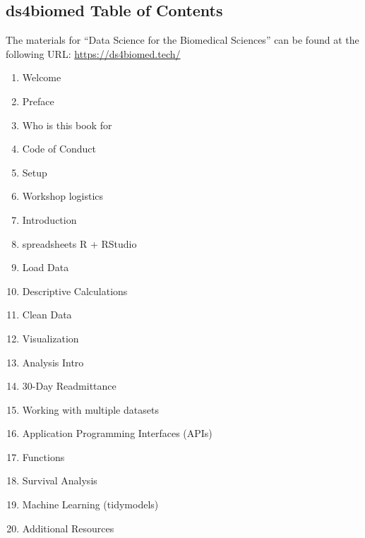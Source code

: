 \documentclass[030-workshop.tex]{subfiles}
\begin{document}
\subsection{ds4biomed Table of Contents}
\label{sse:ds4biomed-toc}

The materials for ``Data Science for the Biomedical Sciences'' can be found at the following URL:
\url{https://ds4biomed.tech/}

\begin{enumerate}
    \item Welcome
    \item Preface
    \item Who is this book for
    \item Code of Conduct
    \item Setup
    \item Workshop logistics
    \item Introduction
    \item spreadsheets R + RStudio
    \item Load Data
    \item Descriptive Calculations
    \item Clean Data
    \item Visualization
    \item Analysis Intro
    \item 30-Day Readmittance
    \item Working with multiple datasets
    \item Application Programming Interfaces (APIs)
    \item Functions
    \item Survival Analysis
    \item Machine Learning (tidymodels)
    \item Additional Resources
  \end{enumerate}
\end{document}
